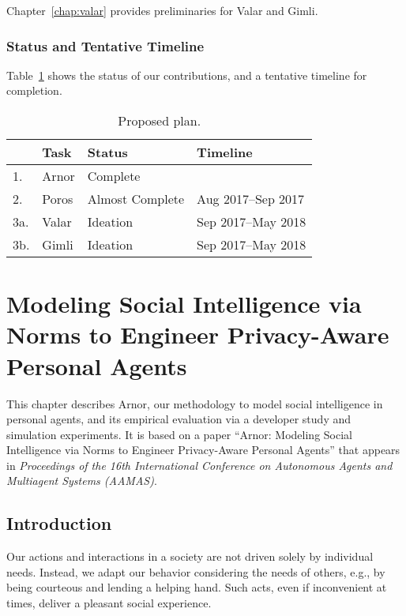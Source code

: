 \documentclass[11pt,          %
               phd,           %
               onehalfspacing %
               ]{ncsuthesis}
\newcommand{\frameworkA}{Arnor\xspace}
\newcommand{\frameworkB}{Poros\xspace}
\newcommand{\frameworkC}{Valar\xspace}
\newcommand{\frameworkD}{Gimli\xspace}
\begin{document}
Chapter~\ref{chap:valar} provides preliminaries for \frameworkC and \frameworkD. 

%
\subsection{Status and Tentative Timeline}
\label{sec:intro-plan}
%

Table~\ref{tab:proposed-plan} shows the status of our contributions, and 
a tentative timeline for completion.

\begin{table}[!htb]
\centering
\caption{Proposed plan.}
\begin{tabular}{@{}p{2cm}p{4cm}p{4cm}p{5cm}@{}}
\toprule
& Task&Status&Timeline\\
\midrule
1. & \frameworkA & Complete & \\
2. & \frameworkB & Almost Complete & Aug 2017--Sep 2017\\
3a.& \frameworkC & Ideation & Sep 2017--May 2018 \\
3b.& \frameworkD & Ideation & Sep 2017--May 2018\\

\bottomrule
\end{tabular}
\label{tab:proposed-plan}
\end{table}



\chapter[Modeling Social Intelligence via Norms]{Modeling Social Intelligence via Norms to Engineer Privacy-Aware Personal Agents}
\label{chap:arnor}

This chapter describes \frameworkA, our methodology to model social
intelligence in personal agents, and its empirical evaluation via a
developer study and simulation experiments. It is based on a
paper ``Arnor: Modeling Social Intelligence via Norms to Engineer
Privacy-Aware Personal Agents'' that appears in \emph{Proceedings of the
16th International Conference on Autonomous Agents and Multiagent
Systems (AAMAS)}.

\section{Introduction}
\label{sec:arnor-intro}

Our actions and interactions in a society are not driven solely by
individual needs. Instead, we adapt our behavior considering the needs
of others, e.g., by being courteous and lending a helping hand. Such
acts, even if inconvenient at times, deliver a pleasant social
experience.
\end{document}
